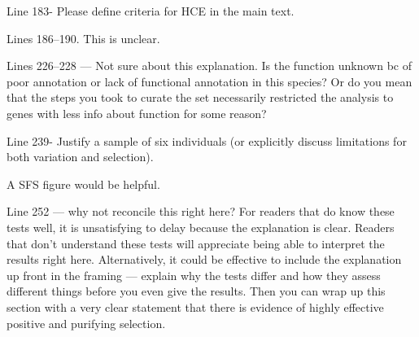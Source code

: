 
\begin{point}{} %
Line 183- Please define criteria for HCE in the main text.
\end{point}


\begin{point}{} %
Lines 186--190. This is unclear.
\end{point}


\begin{point}{} %
Lines 226--228 --- Not sure about this explanation. Is the function
unknown bc of poor annotation or lack of functional annotation in this
species? Or do you mean that the steps you took to curate the set
necessarily restricted the analysis to genes with less info about
function for some reason?
\end{point}


\begin{point}{} %
Line 239- Justify a sample of six individuals (or explicitly discuss
limitations for both variation and selection).
\end{point}


\begin{point}{} %
A SFS figure would be helpful.
\end{point}


\begin{point}{} %
Line 252 --- why not reconcile this right here? For readers that do know
these tests well, it is unsatisfying to delay because the explanation is
clear. Readers that don't understand these tests will appreciate being
able to interpret the results right here. Alternatively, it could be
effective to include the explanation up front in the framing --- explain
why the tests differ and how they assess different things before you even
give the results. Then you can wrap up this section with a very clear
statement that there is evidence of highly effective positive and
purifying selection.
\end{point}

